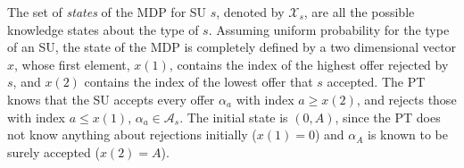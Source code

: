 

The set of \textit{states} of the MDP for SU $s$, denoted by $\mathcal{X}_s$, are all the possible knowledge states about the type of $s$. Assuming uniform probability for the type of an SU, the state of the MDP is completely defined by a two dimensional vector $x$, whose first element, $x(1)$, contains the index of the highest offer rejected by $s$, and $x(2)$ contains the index of the lowest offer that $s$ accepted.
The PT knows that the SU accepts every offer $\alpha_a$ with index $a \geq x(2)$, and rejects those with index $a \leq x(1)$, $\alpha_a \in \mathcal{A}_s$.
The initial state is $(0,A)$, since the PT does not know anything about rejections initially ($x(1)=0$) and $\alpha_A$ is known to be surely accepted ($x(2)=A$).

